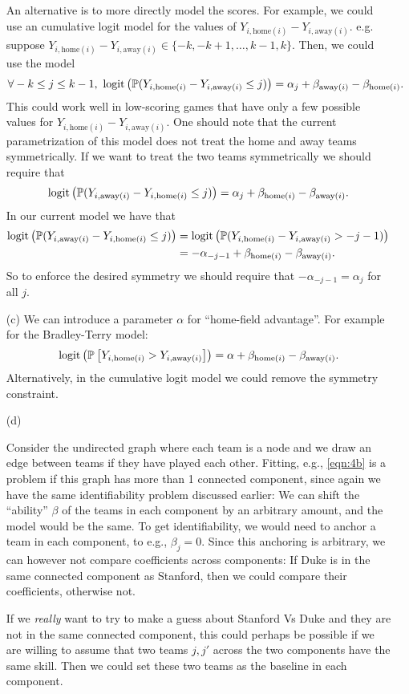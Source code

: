 \begin{enumerate}
An alternative is to more directly model the scores. For example, we could use an cumulative logit model for the values of $Y_{i, \text{home}(i)}  - Y_{i, \text{away}(i)}$. e.g. suppose $Y_{i, \text{home}(i)}  - Y_{i, \text{away}(i)} \in \{-k,-k+1,\dots,k-1,k\}$. Then, we could use the model
\[
\forall -k \leq j \leq k-1,\ \text{logit}\left(\mathbb{P}(Y_{i, \text{home}(i)}  - Y_{i, \text{away}(i)} \leq j)\right) = \alpha_j + \beta_{\text{away}(i)} -  \beta_{\text{home}(i)}.
\]
This could work well in low-scoring games that have only a few possible values for $Y_{i, \text{home}(i)}  - Y_{i, \text{away}(i)}$. One should note that the current parametrization of this model does not treat the home and away teams symmetrically. If we want to treat the two teams symmetrically we should require that
\[
\text{logit}\left(\mathbb{P}(Y_{i, \text{away}(i)}  - Y_{i, \text{home}(i)} \leq j)\right) = \alpha_j + \beta_{\text{home}(i)} -  \beta_{\text{away}(i)}.
\]
In our current model we have that 
\begin{align*}
\text{logit}\left(\mathbb{P}(Y_{i, \text{away}(i)}  - Y_{i, \text{home}(i)} \leq j)\right) & = \text{logit}\left(\mathbb{P}(Y_{i, \text{home}(i)}  - Y_{i, \text{away}(i)} > -j  -1)\right)\\
& = -\alpha_{-j-1} + \beta_{\text{home}(i)} -  \beta_{\text{away}(i)}.
\end{align*}
So to enforce the desired symmetry we should require that $-\alpha_{-j-1} = \alpha_j$ for all $j$. 


\item[(c)] We can introduce a parameter $\alpha$ for ``home-field advantage''. For example for the Bradley-Terry model:
\begin{equation*}
\text{logit}\left( \mathbb{P}_{}\left[ Y_{i, \text{home}(i)} > Y_{i, \text{away}(i)}\right]\right) = \alpha + \beta_{\text{home}(i)} - \beta_{\text{away}(i)}.
\end{equation*}
Alternatively, in the cumulative logit model we could remove the symmetry constraint.

\item[(d)] 

Consider the undirected graph where each team is a node and we draw an edge between teams if they have played each other. Fitting, e.g., \eqref{eqn:4b} is a problem if this graph has more than 1 connected component, since again we have the same identifiability problem discussed earlier: We can shift the ``ability'' $\beta$ of the teams in each component by an arbitrary amount, and the model would be the same. To get identifiability, we would need to anchor a team in each component, to e.g., $\beta_j=0$. Since this anchoring is arbitrary, we can however not compare coefficients across components: If Duke is in the same connected component as Stanford, then we could compare their coefficients, otherwise not. 

If we \emph{really} want to try to make a guess about Stanford Vs Duke and they are not in the same connected component, this could perhaps be possible if we are willing to assume that two teams $j,j'$ across the two components have the same skill. Then we could set these two teams as the baseline in each component.
	  	
\end{enumerate}


